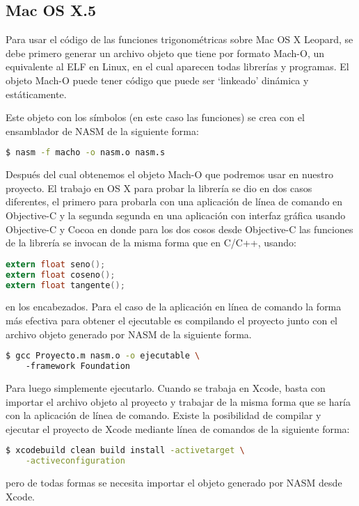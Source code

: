\subsection{Mac OS X.5}
%
%


%

Para usar el código de las funciones trigonométricas sobre Mac OS X Leopard, se debe primero generar un archivo objeto que tiene por formato Mach-O, un equivalente al ELF en Linux, en el cual aparecen todas librerías y programas. El objeto Mach-O puede tener código que puede ser `linkeado' dinámica y estáticamente.

Este objeto con los símbolos (en este caso las funciones) se crea con el ensamblador de NASM de la siguiente forma: 
\begin{lstlisting}[language=bash]
 $ nasm -f macho -o nasm.o nasm.s 
\end{lstlisting}
Después del cual obtenemos el objeto Mach-O que podremos usar en nuestro proyecto. El trabajo en OS X para probar la librería se dio en dos casos diferentes, el primero para probarla con una aplicación de línea de comando en Objective-C y la segunda segunda en una aplicación con interfaz gráfica usando Objective-C y Cocoa en donde para los dos cosos desde Objective-C las funciones de la librería se invocan de la misma forma que en C/C++, usando:\begin{lstlisting}[language=C]
extern float seno();
extern float coseno();
extern float tangente();
\end{lstlisting}
en los encabezados.
Para el caso de la aplicación en línea de comando la forma más efectiva para obtener el ejecutable es compilando el proyecto junto con el archivo objeto generado por NASM de la siguiente forma.
\begin{lstlisting}[language=bash]
 $ gcc Proyecto.m nasm.o -o ejecutable \ 
 	-framework Foundation
\end{lstlisting}
Para luego simplemente ejecutarlo.
Cuando se trabaja en Xcode, basta con importar el archivo objeto al proyecto y trabajar de la misma forma que se haría con la aplicación de línea de comando.
Existe la posibilidad de compilar y ejecutar el proyecto de Xcode mediante línea de comandos de la siguiente forma:
\begin{lstlisting}[language=bash]
 $ xcodebuild clean build install -activetarget \
 	-activeconfiguration
\end{lstlisting}
pero de todas formas se necesita importar el objeto generado por NASM desde Xcode.\\

